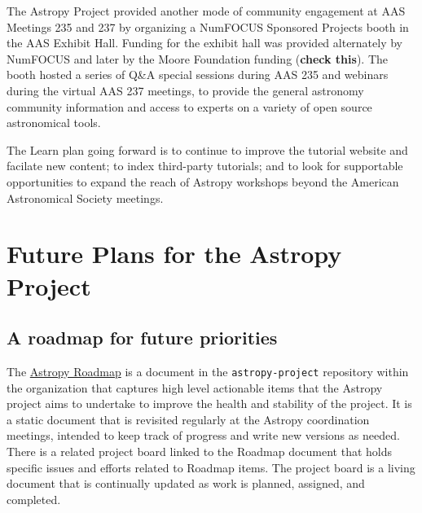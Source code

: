 \documentclass[modern]{aastex631}
\newcommand{\secauthor}[1]{{\color{blue}Author:~\textit{#1}}}
\begin{document}
\begin{description}
The Astropy Project provided another mode of community engagement at AAS
Meetings 235 and 237 by organizing a NumFOCUS Sponsored Projects booth in the
AAS Exhibit Hall.
Funding for the exhibit hall was provided alternately by NumFOCUS and later by
the Moore Foundation funding (\textbf{check this}).
The booth hosted a series of Q\&A special sessions during AAS 235 and webinars
during the virtual AAS 237 meetings, to provide the general astronomy community
information and access to experts on a variety of open source astronomical
tools.
\end{description}


The Learn plan going forward is to continue to improve the tutorial website and
facilate new content;
to index third-party tutorials; and to look for supportable opportunities to
expand the reach of Astropy workshops beyond the American Astronomical Society
meetings.


\section{Future Plans for the Astropy Project} \label{sec:future}

\subsection{A roadmap for future priorities}

The
\href{https://github.com/astropy/astropy-project/blob/main/roadmap/roadmap.md}{Astropy Roadmap} is a document in the \texttt{astropy-project} \github
repository within the \astropy organization that captures high level actionable
items that the Astropy project aims to undertake to improve the health and
stability of the project. It is a static document that is revisited regularly at
the Astropy coordination meetings, intended to keep track of progress and write
new versions as needed. There is a related project board linked to the Roadmap
document that holds specific issues and efforts related to Roadmap items. The
project board is a living document that is continually updated as work is
planned, assigned, and completed.
\end{document}
